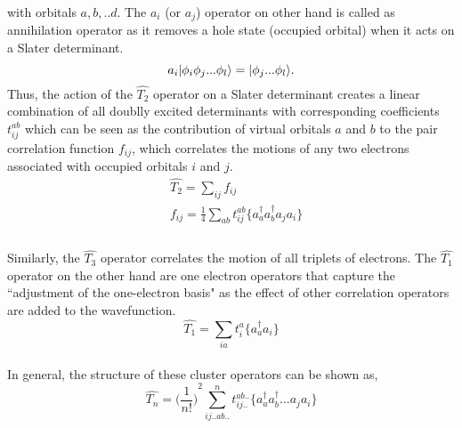 with orbitals $a,b,..d$. The $a_i$ (or $a_j$) operator on other hand is called 
as annihilation operator as it removes a hole state (occupied orbital) when it 
acts on a Slater determinant.
\begin{equation}
a_i| \phi_i\phi_j...\phi_l \rangle = | \phi_j...\phi_l \rangle.
\end{equation}
Thus, the action of the $\hat{T_2} $ operator on a Slater determinant creates a 
linear combination of all doublly excited determinants with corresponding coefficients
$t^{ab}_{ij}$ which can be seen as the contribution of virtual orbitals $a$ and $b$
to the pair correlation function $f_{ij}$, which correlates the motions of any two 
electrons associated with occupied orbitals $i$ and $j$. 
\\
\begin{equation}
\begin{split}
& \hat{T_2} = \sum_{ij}f_{ij} \\
& f_{ij} = \frac{1}{4}\sum_{ab}t^{ab}_{ij}\{a^\dagger_aa^\dagger_ba_ja_i\}\\
\end{split}
\end{equation}
\\
Similarly, the ${\hat{T_3}}$ operator correlates the motion of all triplets of electrons. 
The $\hat{T_1}$ operator on the other hand are one electron operators that capture the 
``adjustment of the one-electron basis"\cite{Crawford00} as the effect of other correlation operators 
are added to the wavefunction.
\\
\begin{equation}
\hat{T_1} = \sum_{ia}t^a_i\{{a}^\dagger_a a_i\}
\end{equation}
\\
In general, the structure of these cluster operators can be shown as,
\\
\begin{equation}
\hat{T_n} = {\bigg(\frac{1}{n!}\bigg)}^2\sum_{ij..ab..}^nt^{ab..}_{ij..}\{a^\dagger_aa^\dagger_b...a_ja_i\}
\end{equation}
\\
